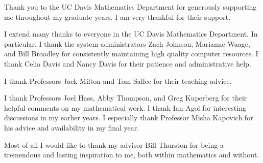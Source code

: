 Thank you to the UC Davis Mathematics Department for generously
supporting me throughout my graduate years.  I am very thankful
for their support.

I extend many thanks to everyone in the UC Davis Mathematics 
Department.
In particular, I thank the system administrators Zach Johnson, 
Marianne Waage, and Bill Broadley for consistently maintaining 
high quality computer resources.  I thank Celia Davis and Nancy 
Davis for their patience and administrative help.

I thank Professors Jack Milton and Tom Sallee for their teaching
advice.

I thank Professors Joel Hass, Abby Thompson, and Greg Kuperberg for 
their helpful comments on my mathematical work.  
I thank Ian Agol for interesting discussions in my earlier years.
I especially thank Professor Misha Kapovich for his advice 
and availability in my final year.

Most of all I would like to thank my advisor Bill Thurston 
for being a tremendous and lasting inspiration to me, both within 
mathematics and without.